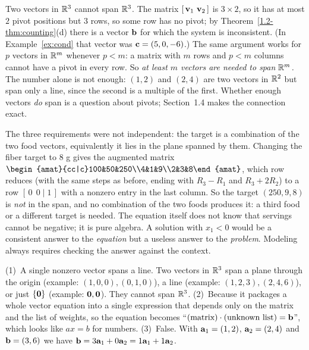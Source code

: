 \documentclass[11pt]{article}
\begin{document}
\begin{description}[leftmargin=0pt,itemsep=5pt]
  \item[Pause and think \ref{think:howmany}.] Two vectors in $\mathbb{R}^3$ cannot span $\mathbb{R}^3$. The matrix $[\,\mathbf{v}_1\ \mathbf{v}_2\,]$ is $3\times2$, so it has at most $2$
        pivot positions but $3$ rows, so some row has no pivot; by Theorem~\ref{1.2-thm:counting}(d) there is a vector $\mathbf{b}$ for which the system is
        inconsistent. (In Example~\ref{ex:cond} that vector was $\mathbf{c}=(5,0,-6)$.) The same argument works for $p$ vectors in $\mathbb{R}^m$ whenever $p<m$:
        a matrix with $m$ rows and $p<m$ columns cannot have a pivot in every row. So \emph{at least $m$ vectors are needed to span $\mathbb{R}^m$.}
        The number alone is not enough: $(1,2)$ and $(2,4)$ are two vectors in $\mathbb{R}^2$ but span only a line, since the second is a multiple of the first.
        Whether enough vectors \emph{do} span is a question about pivots; Section~1.4 makes the connection exact.
  \item[Pause and think \ref{think:feasible}.] The three requirements were not independent: the target is a combination of the two food vectors, equivalently it lies in the
        plane spanned by them. Changing the fiber target to $8$ g gives the augmented matrix
        $\begin{amat}{cc|c}100&50&250\\4&1&9\\2&3&8\end{amat}$, which row reduces (with the same steps as before, ending with $R_3-R_1$ and $R_3+2R_2$) to a row $[\,0\ \ 0\mid1\,]$ with a nonzero
        entry in the last column. So the target $(250,9,8)$ is \emph{not} in the span, and no combination of the two foods produces it: a third food or a different target is needed.
        The equation itself does not know that servings cannot be negative; it is pure algebra. A solution with $x_1<0$ would be a consistent answer to the \emph{equation} but a
        useless answer to the \emph{problem}. Modeling always requires checking the answer against the context.
  \item[Before the next section.] (1)~A single nonzero vector spans a line. Two vectors in $\mathbb{R}^3$ span a plane through the origin (example: $(1,0,0),(0,1,0)$), a line
        (example: $(1,2,3),(2,4,6)$), or just $\{\mathbf{0}\}$ (example: $\mathbf{0},\mathbf{0}$). They cannot span $\mathbb{R}^3$. (2)~Because it packages a whole
        vector equation into a single expression that depends only on the matrix and the list of weights, so the equation becomes
        ``$(\text{matrix})\cdot(\text{unknown list})=\mathbf{b}$'', which looks like $ax=b$ for numbers. (3)~False.
        With $\mathbf{a}_1=(1,2)$, $\mathbf{a}_2=(2,4)$ and $\mathbf{b}=(3,6)$ we have $\mathbf{b}=3\mathbf{a}_1+0\mathbf{a}_2=1\mathbf{a}_1+1\mathbf{a}_2$.
\end{description}
\end{document}
